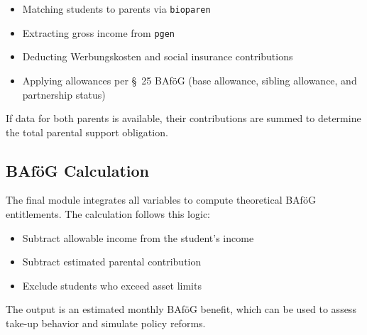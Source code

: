 \begin{itemize}
  \item Matching students to parents via \texttt{bioparen}
  \item Extracting gross income from \texttt{pgen}
  \item Deducting Werbungskosten and social insurance contributions
  \item Applying allowances per §~25 BAföG (base allowance, sibling allowance, and partnership status)
\end{itemize}

If data for both parents is available, their contributions are summed to determine the total parental support obligation.

\subsection{BAföG Calculation}

The final module integrates all variables to compute theoretical BAföG entitlements. The calculation follows this logic:

\begin{itemize}
  \item Subtract allowable income from the student’s income
  \item Subtract estimated parental contribution
  \item Exclude students who exceed asset limits
\end{itemize}

The output is an estimated monthly BAföG benefit, which can be used to assess take-up behavior and simulate policy reforms.


